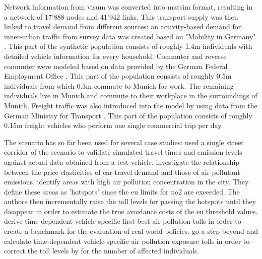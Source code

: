 Network information from \acrshort{visum} was converted into \acrshort{matsim} format, resulting in a network of 17'888 nodes and 41'942 links.
%
This transport supply was then linked to travel demand from different sources: an activity-based demand for inner-urban traffic from survey data was created based on "Mobility in Germany" \citep[MiD 2002,][]{FollmerEtAl_TechRep_infasDIW_2004}. This part of the synthetic population consists of roughly 1.4m individuals with detailed vehicle information for every household.
%
Commuter and reverse commuter were modeled based on data provided by the German Federal Employment Office \citep{BoehmeEigenhueller_TechRep_IAB_2006}. This part of the population consists of roughly 0.5m individuals from which 0.3m commute to Munich for work. The remaining individuals live in Munich and commute to their workplace in the surroundings of Munich.
%
Freight traffic was also introduced into the model by using data from the German Ministry for Transport \citep{ITBBVU_TechRep_2007}. This part of the population consists of roughly 0.15m freight vehicles who perform one single commercial trip per day.

The scenario has so far been used for several case studies:
%
\citet{HuelsmannEtAl_LAS_2011} used a single street corridor of the scenario to validate simulated travel times and emission levels against actual data obtained from a test vehicle.
%
\citet{KickhoeferEtAl_VanoutriveVerhetsel_2013} investigate the relationship between the price elasticities of car travel demand and those of air pollutant emissions.
%
\citet{HuelsmannEtAl_GerikeEtAl_2013} identify areas with high air pollution concentration in the city. They define these areas as 'hotspots' since the \gls{eu} limits for \gls{no2} are exceeded. The authors then incrementally raise the toll levels for passing the hotspots until they disappear in order to estimate the true avoidance costs of the \gls{eu} threshold values.
%
\citet{KickhoeferEtAl_NSE_2013} derive time-dependent vehicle-specific first-best air pollution tolls in order to create a benchmark for the evaluation of real-world policies.
%
\citet{KickhoeferKern_MobilTUM_2014} go a step beyond and calculate time-dependent vehicle-specific air pollution exposure tolls in order to correct the toll levels by \citet{KickhoeferEtAl_NSE_2013} for the number of affected individuals.



